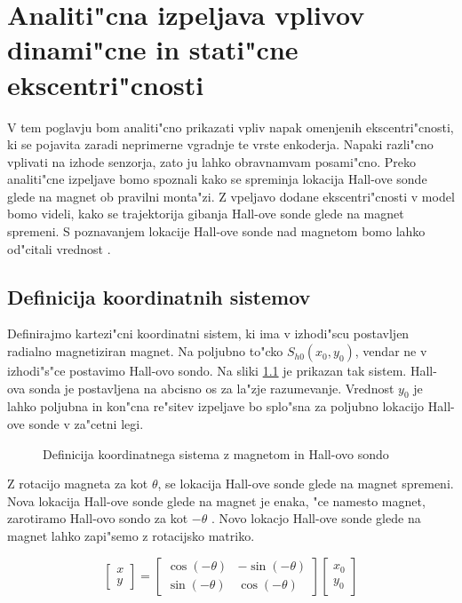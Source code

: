 \chapter{Analiti"cna izpeljava vplivov dinami"cne in stati"cne ekscentri"cnosti}

V tem poglavju bom analiti"cno prikazati vpliv napak omenjenih ekscentri"cnosti, ki se pojavita zaradi neprimerne vgradnje te vrste enkoderja. Napaki razli"cno vplivati na izhode senzorja, zato ju lahko obravnamvam posami"cno. Preko analiti"cne izpeljave bomo spoznali kako se spreminja lokacija Hall-ove sonde glede na magnet ob pravilni monta"zi. Z vpeljavo dodane ekscentri"cnosti v model bomo videli, kako se trajektorija gibanja Hall-ove sonde glede na magnet spremeni. S poznavanjem lokacije Hall-ove sonde nad magnetom bomo lahko od"citali vrednost \Bz.


\section{Definicija koordinatnih sistemov}

Definirajmo kartezi"cni koordinatni sistem, ki ima v izhodi"scu postavljen radialno magnetiziran magnet. Na poljubno to"cko $S_{h0}(x_0,y_0)$, vendar ne v izhodi"s"ce postavimo Hall-ovo sondo. Na sliki \ref{fig:def_kks} je prikazan tak sistem. Hall-ova sonda je postavljena na abcisno os za la"zje razumevanje. Vrednost $y_0$ je lahko poljubna in kon"cna re"sitev izpeljave bo splo"sna za poljubno lokacijo Hall-ove sonde v za"cetni legi.

\begin{figure}[h!]
	\centering
	\caption{Definicija koordinatnega sistema z magnetom in Hall-ovo sondo}
	\label{fig:def_kks}
\end{figure}

Z rotacijo magneta za kot $\theta$, se lokacija Hall-ove sonde glede na magnet spremeni. Nova lokacija Hall-ove sonde glede na magnet je enaka, "ce namesto magnet, zarotiramo Hall-ovo sondo za kot $-\theta$ . Novo lokacjo Hall-ove sonde glede na magnet lahko zapi"semo z rotacijsko matriko.

\begin{equation}
\label{equ:rotacija_hall}
\begin{bmatrix} x\\y \end{bmatrix}=
\begin{bmatrix} \cos(-\theta)&-\sin(-\theta)\\\sin(-\theta)&\cos(-\theta) \end{bmatrix}
\begin{bmatrix} x_0\\y_0 \end{bmatrix}
\end{equation}

